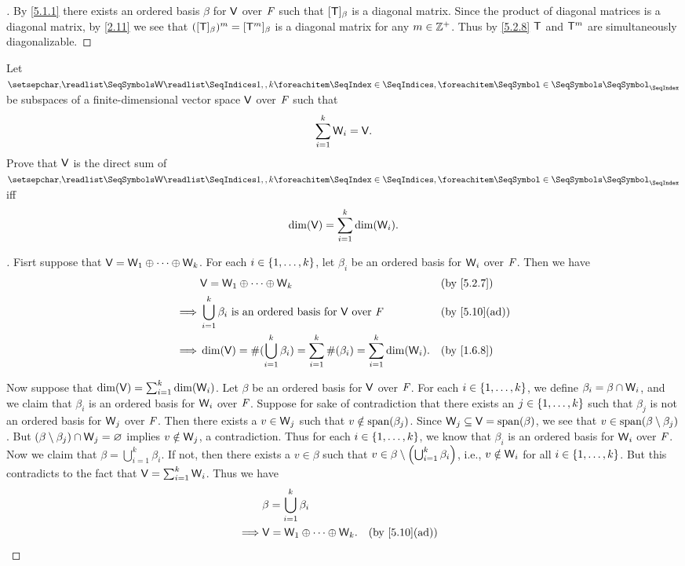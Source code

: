 \begin{proof}[]
	By \cref{5.1.1} there exists an ordered basis \(\beta\) for \(\mathsf{V}\) over \(\mathit{F}\) such that \([\mathsf{T}]_{\beta}\) is a diagonal matrix.
	Since the product of diagonal matrices is a diagonal matrix, by \cref{2.11} we see that \(([\mathsf{T}]_{\beta})^m = [\mathsf{T}^m]_{\beta}\) is a diagonal matrix for any \(m \in \mathbb{Z}^+\).
	Thus by \cref{5.2.8} \(\mathsf{T}\) and \(\mathsf{T}^m\) are simultaneously diagonalizable.
\end{proof}

\begin{ex}\label{ex:5.2.20}
	Let \(\seq{\W}{1,,k}\) be subspaces of a finite-dimensional vector space \(\mathsf{V}\) over \(\mathit{F}\) such that
	\[
		\sum_{i = 1}^k \mathsf{W}_i = \mathsf{V}.
	\]
	Prove that \(\mathsf{V}\) is the direct sum of \(\seq{\W}{1,,k}\) iff
	\[
		\dim(\mathsf{V}) = \sum_{i = 1}^k \dim(\mathsf{W}_i).
	\]
\end{ex}

\begin{proof}[]
	Fisrt suppose that \(\mathsf{V} = \mathsf{W}_1 \oplus \cdots \oplus \mathsf{W}_k\).
	For each \(i \in \left\lbrace1, \dots, k\right\rbrace\), let \(\beta_i\) be an ordered basis for \(\mathsf{W}_i\) over \(\mathit{F}\).
	Then we have
	\begin{align*}
		         & \V = \W_1 \oplus \cdots \oplus \W_k                                                                &  & \by{5.2.7}    \\
		\implies & \bigcup_{i = 1}^k \beta_i \text{ is an ordered basis for } \V \text{ over } \F                     &  & \by{5.10}[ad] \\
		\implies & \dim(\V) = \#(\bigcup_{i = 1}^k \beta_i) = \sum_{i = 1}^k \#(\beta_i) = \sum_{i = 1}^k \dim(\W_i). &  & \by{1.6.8}
	\end{align*}

	Now suppose that \(\dim(\mathsf{V}) = \sum_{i = 1}^k \dim(\mathsf{W}_i)\).
	Let \(\beta\) be an ordered basis for \(\mathsf{V}\) over \(\mathit{F}\).
	For each \(i \in \left\lbrace1, \dots, k\right\rbrace\), we define \(\beta_i = \beta \cap \mathsf{W}_i\), and we claim that \(\beta_i\) is an ordered basis for \(\mathsf{W}_i\) over \(\mathit{F}\).
	Suppose for sake of contradiction that there exists an \(j \in \left\lbrace1, \dots, k\right\rbrace\) such that \(\beta_j\) is not an ordered basis for \(\mathsf{W}_j\) over \(\mathit{F}\).
	Then there exists a \(v \in \mathsf{W}_j\) such that \(v \notin \spn{\beta_j}\).
	Since \(\W_j \subseteq \V = \spn{\beta}\), we see that \(v \in \spn{\beta \setminus \beta_j}\).
	But \((\beta \setminus \beta_j) \cap \mathsf{W}_j = \varnothing\) implies \(v \notin \mathsf{W}_j\), a contradiction.
	Thus for each \(i \in \left\lbrace1, \dots, k\right\rbrace\), we know that \(\beta_i\) is an ordered basis for \(\mathsf{W}_i\) over \(\mathit{F}\).
	Now we claim that \(\beta = \bigcup_{i = 1}^k \beta_i\).
	If not, then there exists a \(v \in \beta\) such that \(v \in \beta \setminus \left\lparen\bigcup_{i = 1}^k \beta_i\right\rparen\), i.e., \(v \notin \mathsf{W}_i\) for all \(i \in \left\lbrace1, \dots, k\right\rbrace\).
	But this contradicts to the fact that \(\mathsf{V} = \sum_{i = 1}^k \mathsf{W}_i\).
	Thus we have
	\begin{align*}
		         & \beta = \bigcup_{i = 1}^k \beta_i                       \\
		\implies & \V = \W_1 \oplus \cdots \oplus \W_k. &  & \by{5.10}[ad]
	\end{align*}
\end{proof}

